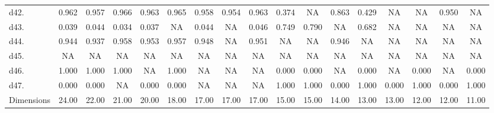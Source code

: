 \begin{table}
\begin{tabular}{lcccccccccccccccc}
d42. & 0.962 & 0.957 & 0.966 & 0.963 & 0.965 & 0.958 & 0.954 & 0.963 & 0.374 & NA    & 0.863 & 0.429 & NA    & NA    & 0.950 & NA \\
d43. & 0.039 & 0.044 & 0.034 & 0.037 & NA    & 0.044 & NA    & 0.046 & 0.749 & 0.790 & NA    & 0.682 & NA    & NA    & NA    & NA \\
d44. & 0.944 & 0.937 & 0.958 & 0.953 & 0.957 & 0.948 & NA    & 0.951 & NA    & NA    & 0.946 & NA    & NA    & NA    & NA    & NA \\
d45. & NA    & NA    & NA    & NA    & NA    & NA    & NA    & NA    & NA    & NA    & NA    & NA    & NA    & NA    & NA    & NA \\
d46. & 1.000 & 1.000 & 1.000 & NA    & 1.000 & NA    & NA    & NA    & 0.000 & 0.000 & NA    & 0.000 & NA    & 0.000 & NA    & 0.000 \\
d47. & 0.000 & 0.000 & NA    & 0.000 & 0.000 & NA    & NA    & NA    & 1.000 & 1.000 & 0.000 & 1.000 & 0.000 & 1.000 & 0.000 & 1.000 \\
\bottomrule Dimensions & 24.00 & 22.00 & 21.00 & 20.00 & 18.00 & 17.00 & 17.00 & 17.00 & 15.00 & 15.00 & 14.00 & 13.00 & 13.00 & 12.00 & 12.00 & 11.00 \\
\end{tabular}%
\end{table}%

